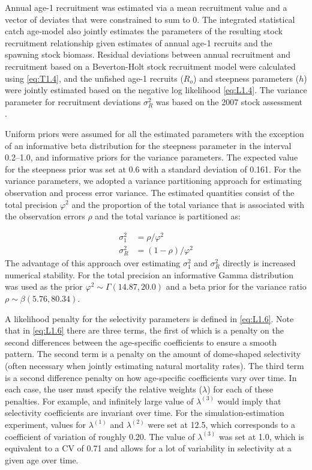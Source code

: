 Annual age-1 recruitment was estimated via a mean recruitment value and a vector of deviates that were constrained to sum to 0.  The integrated statistical catch age-model also jointly estimates the parameters of the resulting stock recruitment relationship given estimates of annual age-1 recruits and the  spawning stock biomass.  Residual deviations between annual recruitment and recruitment based on a Beverton-Holt stock recruitment model were calculated using \eqref{eq:T1.4}, and the unfished age-1 recruits ($R_o$) and steepness parameters ($h$) were jointly estimated based on the negative log likelihood \eqref{eq:L1.4}.  The variance parameter for recruitment deviations $\sigma_R^2$ was based on the 2007 stock assessment \citep{helser2007stock}.

Uniform priors were assumed for all the estimated parameters with the exception of an informative beta distribution for the steepness parameter in the interval 0.2--1.0, and informative priors for the variance parameters.  The expected value for the steepness prior was set at 0.6 with a standard deviation of 0.161.  For the variance parameters, we adopted a variance partitioning approach for estimating observation and process error variance. The estimated quantities consist of the total precision $\varphi^2$ and the proportion of the total variance that is associated with the observation errors $\rho$ and the total variance is partitioned as:  

\begin{align}
	\sigma^2_1 &= \rho/\varphi^2 \nonumber \\
	\sigma^2_R   &= (1-\rho)/\varphi^2 \label{eq:variance}
\end{align}
The advantage of this approach over estimating $\sigma_1^2$ and $\sigma_R^2$ directly is increased numerical stability.  For the total precision an informative Gamma distribution was used as the prior $\varphi^2 \sim \Gamma(14.87,20.0)$ and a beta prior for the variance ratio $\rho \sim \beta(5.76,80.34)$. 

A likelihood penalty for the selectivity parameters is defined in \eqref{eq:L1.6}.  Note that in \eqref{eq:L1.6} there are three terms, the first of which is a penalty on the second differences between the age-specific coefficients to ensure a smooth pattern.  The second term is a penalty on the amount of dome-shaped selectivity (often necessary when jointly estimating natural mortality rates).  The third term is a second difference penalty on how age-specific coefficients vary over time.  In each case, the user must specify the relative weights ($\lambda$) for each of these penalties.   For example, and infinitely large value of $\lambda^{(3)}$ would imply that selectivity coefficients are invariant over time.  For the simulation-estimation experiment, values for $\lambda^{(1)}$ and $\lambda^{(2)}$ were set at 12.5, which corresponds to a coefficient of variation of roughly 0.20.  The value of $\lambda^{(3)}$ was set at 1.0, which is equivalent to a CV of 0.71 and allows for a lot of variability in selectivity at a given age over time.


